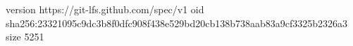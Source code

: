 version https://git-lfs.github.com/spec/v1
oid sha256:23321095c9dc3b8f0dfc908f438e529bd20cb138b738aab83a9cf3325b2326a3
size 5251
